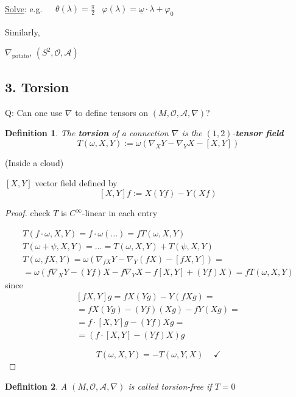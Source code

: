 \documentclass[10pt]{amsart}
\newtheorem{definition}{Definition}
\begin{document}
\begin{multicols*}{2}
\underline{Solve}: e.g. $\begin{aligned} 
& \theta(\lambda) = \frac{\pi}{2}
& \varphi(\lambda) = \underline{\omega} \cdot \lambda + \varphi_0 
\end{aligned} $
	
	Similarly, 
	
	$\nabla_{\text{potato}}$, $(S^2, \mathcal{O}, \mathcal{A})$
	
	\subsection*{3. Torsion}
Q: Can one use $\nabla$ to define tensors on $(M,\mathcal{O}, \mathcal{A}, \nabla)$? 
	
	\begin{definition}
		The \textbf{torsion} of a connection $\nabla$ is the $(1,2)$-\textbf{tensor field}
		\begin{equation}
		T(\omega,X,Y) := \omega( \nabla_X Y - \nabla_Y X - [X,Y])
		\end{equation}
	\end{definition}
	
	(Inside a cloud) 
	
	$[X,Y]$ vector field defined by 
	\[
	[X,Y]f:= X(Yf) - Y(Xf)
	\]
	
	\begin{proof}
		check $T$ is $C^{\infty}$-linear in each entry

\[
\begin{gathered}
	T(f\cdot \omega, X, Y) = f\cdot \omega(\dots) = fT(\omega, X, Y) \\
	T(\omega + \psi, X, Y) = \dots = T(\omega, X, Y) + T(\psi, X, Y) \\
	T(\omega, fX, Y) = \omega( \nabla_{fX} Y - \nabla_Y (fX) - [fX, Y]) = \\
	= \omega(f\nabla_X Y - (Yf)X - f\nabla_Y X - f[X,Y] + (Yf)X) = fT(\omega,X,Y)
\end{gathered}
\]
since
\[
\begin{gathered} 
	[fX,Y] g = fX(Yg) - Y(fXg) = \\
	= fX(Yg) - (Yf) (Xg) - fY(Xg) = \\
	= f\cdot [X,Y] g - (Yf) Xg = \\
	= (f\cdot [X,Y] - (Yf)X) g
\end{gathered} 
\]
		
\[
T(\omega, X, Y) = -T(\omega, Y , X)  \quad \, \checkmark
\]
	\end{proof}
	
	\begin{definition}
		A $(M, \mathcal{O}, \mathcal{A}, \nabla)$ is called torsion-free if $T=0$
	\end{definition}
	

\end{multicols*}
\end{document}
